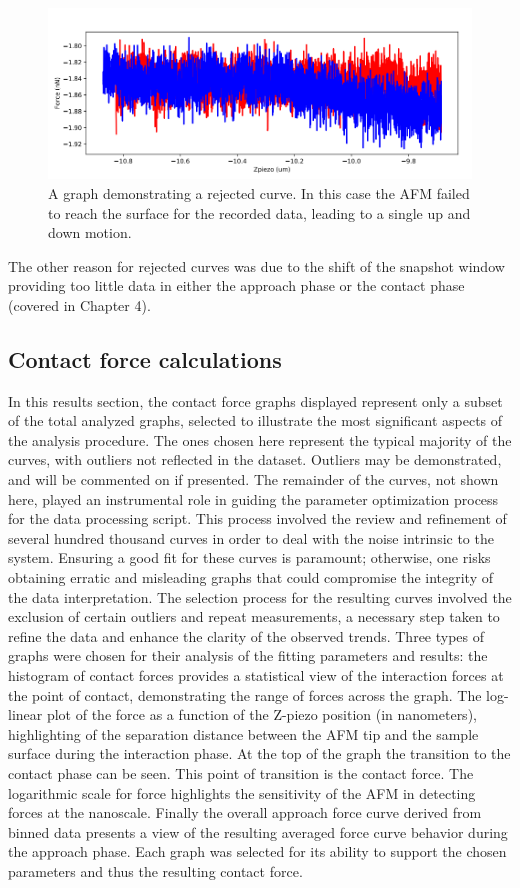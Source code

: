 \begin{figure}
    \centering
    \includegraphics[width=0.65\linewidth]{chapter5/miss_error.png}
    \caption{A graph demonstrating a rejected curve. In this case the AFM failed to reach the surface for the recorded data, leading to a single up and down motion.}
    \label{fig:miss-error}
\end{figure}

The other reason for rejected curves was due to the shift of the snapshot window providing too little data in either the approach phase or the contact phase (covered in Chapter 4). 

\subsection{Contact force calculations}

In this results section, the contact force graphs displayed represent only a subset of the total analyzed graphs, selected to illustrate the most significant aspects of the analysis procedure. The ones chosen here represent the typical majority of the curves, with outliers not reflected in the dataset. Outliers may be demonstrated, and will be commented on if presented. The remainder of the curves, not shown here, played an instrumental role in guiding the parameter optimization process for the data processing script. This process involved the review and refinement of several hundred thousand curves in order to deal with the noise intrinsic to the system. Ensuring a good fit for these curves is paramount; otherwise, one risks obtaining erratic and misleading graphs that could compromise the integrity of the data interpretation. The selection process for the resulting curves involved the exclusion of certain outliers and repeat measurements, a necessary step taken to refine the data and enhance the clarity of the observed trends. Three types of graphs were chosen for their analysis of the fitting parameters and results: the histogram of contact forces provides a statistical view of the interaction forces at the point of contact, demonstrating the range of forces across the graph. The log-linear plot of the force as a function of the Z-piezo position (in nanometers), highlighting of the separation distance between the AFM tip and the sample surface during the interaction phase. At the top of the graph the transition to the contact phase can be seen. This point of transition is the contact force. The logarithmic scale for force highlights the sensitivity of the AFM in detecting forces at the nanoscale. Finally the overall approach force curve derived from binned data presents a view of the resulting averaged force curve behavior during the approach phase. Each graph was selected for its ability to support the chosen parameters and thus the resulting contact force.


